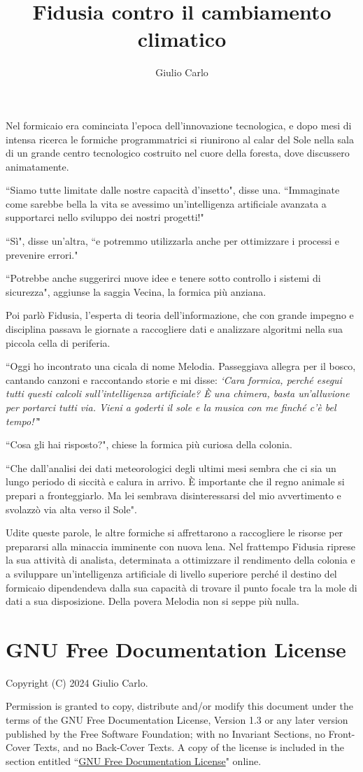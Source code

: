 \documentclass[12pt,b5paper]{article}
\author{Giulio Carlo}
\date{}
\title{Fidusia contro il cambiamento climatico}
\begin{document}
\maketitle
{}
Nel formicaio era cominciata l'epoca dell'innovazione tecnologica, e dopo mesi
di intensa ricerca le formiche programmatrici si riunirono al calar del Sole
nella sala di un grande centro tecnologico costruito nel cuore della foresta,
dove discussero animatamente.

``Siamo tutte limitate dalle nostre capacità d'insetto", disse una. ``Immaginate
come sarebbe bella la vita se avessimo un'intelligenza artificiale avanzata a
supportarci nello sviluppo dei nostri progetti!"

``Sì", disse un'altra, ``e potremmo utilizzarla anche per ottimizzare i processi
e prevenire errori."

``Potrebbe anche suggerirci nuove idee e tenere sotto controllo i sistemi di
sicurezza", aggiunse la saggia Vecina, la formica più anziana.

Poi parlò Fidusia, l'esperta di teoria dell'informazione, che con grande
impegno e disciplina passava le giornate a raccogliere dati e analizzare
algoritmi nella sua piccola cella di periferia.

``Oggi ho incontrato una cicala di nome Melodia. Passeggiava allegra
per il bosco, cantando canzoni e raccontando storie e mi disse:
\emph{`Cara formica, perché esegui tutti questi calcoli sull'intelligenza
artificiale? È una chimera, basta un'alluvione per portarci tutti via. Vieni
a goderti il sole e la musica con me finché c'è bel tempo!'}"

``Cosa gli hai risposto?", chiese la formica più curiosa della colonia.

``Che dall'analisi dei dati meteorologici degli ultimi mesi sembra che ci sia
un lungo periodo di siccità e calura in arrivo. È importante che il regno
animale si prepari a fronteggiarlo. Ma lei sembrava disinteressarsi del mio
avvertimento e svolazzò via alta verso il Sole".

Udite queste parole, le altre formiche si affrettarono a raccogliere le risorse
per prepararsi alla minaccia imminente con nuova lena. Nel frattempo Fidusia
riprese la sua attività di analista, determinata a ottimizzare il rendimento
della colonia e a sviluppare un'intelligenza artificiale di livello superiore
perché il destino del formicaio dipendendeva dalla sua capacità di trovare il
punto focale tra la mole di dati a sua disposizione. Della povera Melodia non
si seppe più nulla.
\newpage
{}
\section*{GNU Free Documentation License}
    Copyright (C)  2024 Giulio Carlo.
   
    Permission is granted to copy, distribute and/or modify this document
    under the terms of the GNU Free Documentation License, Version 1.3
    or any later version published by the Free Software Foundation;
    with no Invariant Sections, no Front-Cover Texts, and no Back-Cover Texts.
    A copy of the license is included in the section entitled ``\href{https://www.gnu.org/licenses/fdl-1.3.en.html}{GNU Free Documentation License}"
    online.
\end{document}
